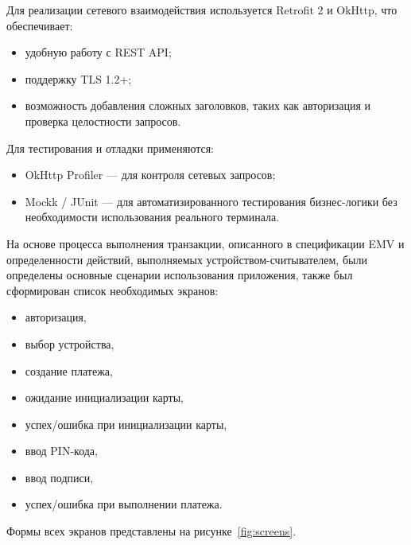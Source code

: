Для реализации сетевого взаимодействия используется Retrofit 2 и OkHttp, что обеспечивает:

\begin{itemize}
    \item удобную работу с REST API;
    \item поддержку TLS 1.2+;
    \item возможность добавления сложных заголовков, таких как авторизация и проверка целостности запросов.
\end{itemize}

Для тестирования и отладки применяются:

\begin{itemize}
    \item OkHttp Profiler — для контроля сетевых запросов;
    \item Mockk / JUnit — для автоматизированного тестирования бизнес-логики без необходимости использования реального терминала.
\end{itemize}


На основе процесса выполнения транзакции, описанного в спецификации EMV и определенности действий, выполняемых устройством-считывателем, были определены основные сценарии использования приложения, также был сформирован список необходимых экранов:
\begin{itemize}
    \item авторизация,
    \item выбор устройства,
    \item создание платежа,
    \item ожидание инициализации карты,
    \item успех/ошибка при инициализации карты,
    \item ввод PIN-кода,
    \item ввод подписи,
    \item успех/ошибка при выполнении платежа.
\end{itemize}

Формы всех экранов представлены на рисунке~\ref{fig:screens}.


